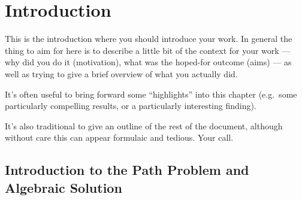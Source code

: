 \documentclass[a4paper,12pt,twoside,openright]{report}
\begin{document}
\pagestyle{empty}
\singlespacing

\onehalfspacing

\singlespacing


\setcounter{page}{0}
\pagestyle{plain}
\tableofcontents
\listoffigures
\listoftables

\onehalfspacing


\chapter{Introduction}
\setcounter{page}{1} 

This is the introduction where you should introduce your work.  In
general the thing to aim for here is to describe a little bit of the
context for your work --- why did you do it (motivation), what was the
hoped-for outcome (aims) --- as well as trying to give a brief
overview of what you actually did.

It's often useful to bring forward some ``highlights'' into 
this chapter (e.g.\ some particularly compelling results, or 
a particularly interesting finding). 

It's also traditional to give an outline of the rest of the
document, although without care this can appear formulaic 
and tedious. Your call. 

\section{Introduction to the Path Problem and Algebraic Solution}
\end{document}
